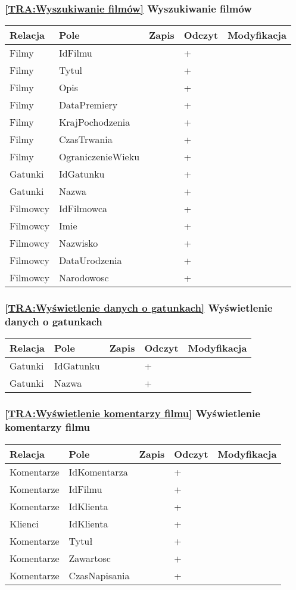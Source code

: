 \subsubsection*{\ref{TRA:Wyszukiwanie filmów} Wyszukiwanie filmów}
\begin{tabularx}{\textwidth}{|Y|Y|Y|Y|Y|}\hline
Relacja & Pole & Zapis & Odczyt & Modyfikacja \\\hline
Filmy & IdFilmu &  & + & \\
Filmy & Tytul &  & + & \\
Filmy & Opis &  & + & \\
Filmy & DataPremiery &  & + & \\
Filmy & KrajPochodzenia &  & + & \\
Filmy & CzasTrwania &  & + & \\
Filmy & OgraniczenieWieku &  & + & \\
Gatunki & IdGatunku &  & + & \\
Gatunki & Nazwa &  & + & \\
Filmowcy & IdFilmowca &  & + & \\
Filmowcy & Imie &  & + & \\
Filmowcy & Nazwisko &  & + & \\
Filmowcy & DataUrodzenia &  & + & \\
Filmowcy & Narodowosc &  & + & \\
\hline\end{tabularx}
\subsubsection*{\ref{TRA:Wyświetlenie danych o gatunkach} Wyświetlenie danych o gatunkach}
\begin{tabularx}{\textwidth}{|Y|Y|Y|Y|Y|}\hline
Relacja & Pole & Zapis & Odczyt & Modyfikacja \\\hline
Gatunki & IdGatunku &  & + & \\
Gatunki & Nazwa &  & + & \\
\hline\end{tabularx}
\subsubsection*{\ref{TRA:Wyświetlenie komentarzy filmu} Wyświetlenie komentarzy filmu}
\begin{tabularx}{\textwidth}{|Y|Y|Y|Y|Y|}\hline
Relacja & Pole & Zapis & Odczyt & Modyfikacja \\\hline
Komentarze & IdKomentarza &  & + & \\
Komentarze & IdFilmu &  & + & \\
Komentarze & IdKlienta &  & + & \\
Klienci & IdKlienta &  & + & \\
Komentarze & Tytuł &  & + & \\
Komentarze & Zawartosc &  & + & \\
Komentarze & CzasNapisania &  & + & \\
\hline\end{tabularx}
